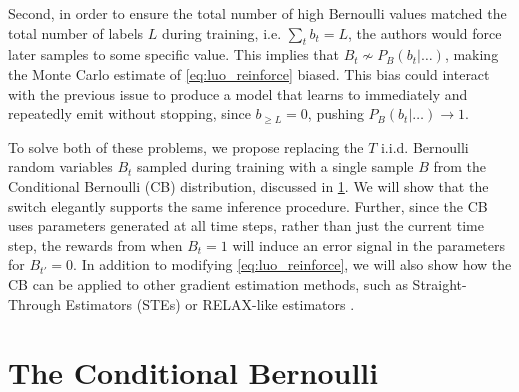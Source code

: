 \documentclass{article}
\begin{document}
Second, in order to ensure the total number of high Bernoulli values matched
the total number of labels $L$ during training, i.e. $\sum_t b_t = L$, the
authors would force later samples to some specific value. This implies that
$B_t \nsim P_B(b_t|\ldots)$, making the Monte Carlo estimate of
\cref{eq:luo_reinforce} biased. This bias could interact with the previous
issue to produce a model that learns to immediately and repeatedly emit without
stopping, since $b_{\geq L} = 0$, pushing $P_B(b_t|\ldots) \to 1$.

To solve both of these problems, we propose replacing the $T$ i.i.d. Bernoulli
random variables $B_t$ sampled during training with a single sample $B$ from
the Conditional Bernoulli (CB) distribution, discussed in \cref{sec:cb}. We
will show that the switch elegantly supports the same inference procedure.
Further, since the CB uses parameters generated at all time steps, rather than
just the current time step, the rewards from when $B_t = 1$ will induce an
error signal in the parameters for $B_{t'} = 0$. In addition to modifying
\cref{eq:luo_reinforce}, we will also show how the CB can be applied to other
gradient estimation methods, such as Straight-Through Estimators (STEs)
\cite{bengioEstimatingPropagatingGradients2013} or RELAX-like estimators
\cite{maddisonConcreteDistributionContinuous2017,grathwohlBackpropagationVoidOptimizing2018}.


\section{The Conditional Bernoulli} \label{sec:cb}
\end{document}
